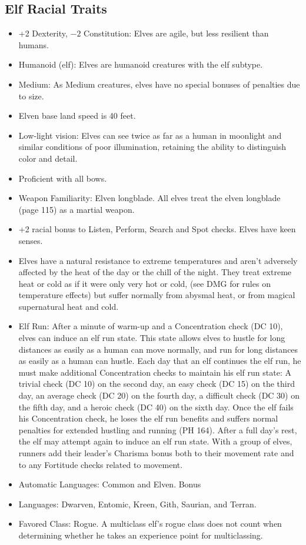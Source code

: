 \subsection{Elf Racial Traits}
\begin{itemize}
    \item +2 Dexterity, $-2$ Constitution: Elves are agile, but less resilient than humans.
    \item Humanoid (elf): Elves are humanoid creatures with the elf subtype.
    \item Medium: As Medium creatures, elves have no special bonuses of penalties due to size.
    \item Elven base land speed is 40 feet.
    \item Low‐light vision: Elves can see twice as far as a human in moonlight and similar conditions of poor illumination, retaining the ability to distinguish color and detail.
    \item Proficient with all bows.
    \item Weapon Familiarity: Elven longblade. All elves treat the elven longblade (page 115) as a martial weapon.
    \item +2 racial bonus to Listen, Perform, Search and Spot checks. Elves have keen senses.
    \item Elves have a natural resistance to extreme temperatures and aren't adversely affected by the heat of the day or the chill of the night. They treat extreme heat or cold as if it were only very hot or cold, (see DMG for rules on temperature effects) but suffer normally from abysmal heat, or from magical supernatural heat and cold.
    \item Elf Run: After a minute of warm-up and a Concentration check (DC 10), elves can induce an elf run state. This state allows elves to hustle for long distances as easily as a human can move normally, and run for long distances as easily as a human can hustle. Each day that an elf continues the elf run, he must make additional Concentration checks to maintain his elf run state: A trivial check (DC 10) on the second day, an easy check (DC 15) on the third day, an average check (DC 20) on the fourth day, a difficult check (DC 30) on the fifth day, and a heroic check (DC 40) on the sixth day. Once the elf fails his Concentration check, he loses the elf run benefits and suffers normal penalties for extended hustling and running (PH 164). After a full day's rest, the elf may attempt again to induce an elf run state. With a group of elves, runners add their leader's Charisma bonus both to their movement rate and to any Fortitude checks related to movement.
    \item Automatic Languages: Common and Elven. Bonus
    \item Languages: Dwarven, Entomic, Kreen, Gith, Saurian, and Terran.
    \item Favored Class: Rogue. A multiclass elf's rogue class does not count when determining whether he takes an experience point for multiclassing.
\end{itemize}
